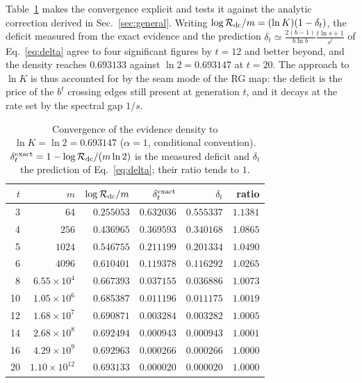 \documentclass[preprint,12pt]{elsarticle}
\newcommand{\Rev}{\mathcal{R}}
\newcommand{\logR}{\log \Rev}
\begin{document}
Table~\ref{tab:density} makes the convergence explicit and tests it against the
analytic correction derived in Sec.~\ref{sec:general}. Writing
$\logR_{\rm dc}/m=(\ln K)(1-\delta_t)$, the deficit measured from the exact
evidence and the prediction
$\delta_t\simeq\frac{2(b-1)}{b\ln b}\frac{t\ln s+1}{s^{t}}$ of
Eq.~\eqref{eq:delta} agree to four significant figures by $t=12$ and better
beyond, and the density reaches $0.693133$ against $\ln2=0.693147$ at $t=20$.
The approach to $\ln K$ is thus accounted for by the seam mode of the RG map:
the deficit is the price of the $b^t$
crossing edges still present at generation $t$, and it decays at the rate set
by the spectral gap $1/s$.

\begin{table}[tb]
  \centering
  \caption{Convergence of the evidence density to $\ln K=\ln2=0.693147$
  ($\alpha=1$, conditional convention). $\delta_t^{\rm exact}=
  1-\logR_{\rm dc}/(m\ln2)$ is the measured deficit and $\delta_t$ the
  prediction of Eq.~\eqref{eq:delta}; their ratio tends to $1$.}
  \label{tab:density}
  \begin{tabular}{rrrrrr}
    \toprule
    $t$ & $m$ & $\logR_{\rm dc}/m$ & $\delta_t^{\rm exact}$ & $\delta_t$
        & ratio\\
    \midrule
    3  & $64$                  & $0.255053$ & $0.632036$ & $0.555337$ & $1.1381$\\
    4  & $256$                 & $0.436965$ & $0.369593$ & $0.340168$ & $1.0865$\\
    5  & $1024$                & $0.546755$ & $0.211199$ & $0.201334$ & $1.0490$\\
    6  & $4096$                & $0.610401$ & $0.119378$ & $0.116292$ & $1.0265$\\
    8  & $6.55{\times}10^{4}$  & $0.667393$ & $0.037155$ & $0.036886$ & $1.0073$\\
    10 & $1.05{\times}10^{6}$  & $0.685387$ & $0.011196$ & $0.011175$ & $1.0019$\\
    12 & $1.68{\times}10^{7}$  & $0.690871$ & $0.003284$ & $0.003282$ & $1.0005$\\
    14 & $2.68{\times}10^{8}$  & $0.692494$ & $0.000943$ & $0.000943$ & $1.0001$\\
    16 & $4.29{\times}10^{9}$  & $0.692963$ & $0.000266$ & $0.000266$ & $1.0000$\\
    20 & $1.10{\times}10^{12}$ & $0.693133$ & $0.000020$ & $0.000020$ & $1.0000$\\
    \bottomrule
  \end{tabular}
\end{table}
\end{document}

